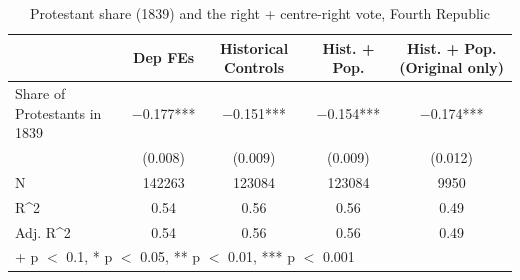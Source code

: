 \begin{table}
\centering
\caption{Protestant share (1839) and the right + centre-right vote, Fourth Republic}
\centering
\begin{tabular}[t]{lcccc}
\toprule
  & Dep FEs & Historical Controls & Hist. + Pop. & Hist. + Pop. (Original only)\\
\midrule
Share of Protestants in 1839 & \num{-0.177}*** & \num{-0.151}*** & \num{-0.154}*** & \num{-0.174}***\\
 & (\num{0.008}) & (\num{0.009}) & (\num{0.009}) & (\num{0.012})\\
\midrule
N & \num{142263} & \num{123084} & \num{123084} & \num{9950}\\
R\textasciicircum{}2 & \num{0.54} & \num{0.56} & \num{0.56} & \num{0.49}\\
Adj. R\textasciicircum{}2 & \num{0.54} & \num{0.56} & \num{0.56} & \num{0.49}\\
\bottomrule
\multicolumn{5}{l}{\rule{0pt}{1em}+ p $<$ 0.1, * p $<$ 0.05, ** p $<$ 0.01, *** p $<$ 0.001}\\
\end{tabular}
\end{table}
